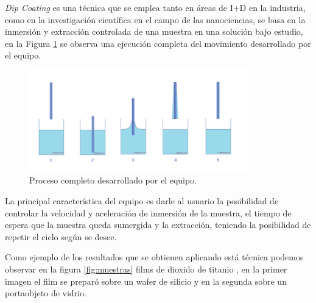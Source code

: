\textit{Dip Coating} es una técnica que se emplea tanto en áreas de I+D en la industria, como en la investigación científica en el campo de las nanociencias, se basa en la inmersión y extracción  controlada de una muestra en una solución bajo estudio, en la Figura \ref{fig:inmersion} se observa una ejecución completa del movimiento desarrollado por el equipo.


\begin{figure}[htpb]
\centering 
\includegraphics[width=0.85\textwidth]{./Figures/dip-coating.png}
\caption{Proceso completo desarrollado por el equipo.}
\label{fig:inmersion}
\end{figure}

 
La principal característica del equipo es darle al usuario la posibilidad de controlar la velocidad y aceleración de inmersión de la muestra, el tiempo de espera que la muestra queda sumergida y la extracción, teniendo la posibilidad de repetir el ciclo según se desee.

Como ejemplo de los resultados que se obtienen aplicando está técnica podemos observar en la figura \ref{fig:muestras} films de dioxido de titanio , en la primer imagen el film se preparó sobre un wafer de silicio y en la segunda sobre un portaobjeto de vidrio.


